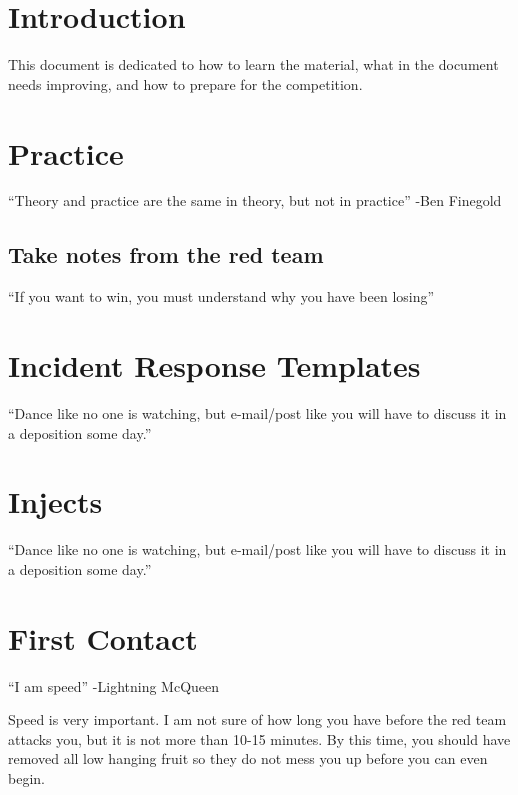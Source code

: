 \documentclass{article}
\begin{document}
\graphicspath{ {./Images/} }
\tableofcontents

\section{Introduction}
This document is dedicated to how to learn the material, what in the document needs improving, and how to prepare for the competition.

\section{Practice}
“Theory and practice are the same in theory, but not in practice”
-Ben Finegold

\subsection{Take notes from the red team}
“If you want to win, you must understand why you have been losing”


\section{Incident Response Templates}
“Dance like no one is watching, but e-mail/post like you will have to discuss it in a deposition some day.”



\section{Injects}
“Dance like no one is watching, but e-mail/post like you will have to discuss it in a deposition some day.”



\section{First Contact}
“I am speed”
-Lightning McQueen

Speed is very important. I am not sure of how long you have before the red team attacks you, but it is not more than 10-15 minutes.
By this time, you should have removed all low hanging fruit so they do not mess you up before you can even begin.
\end{document}
